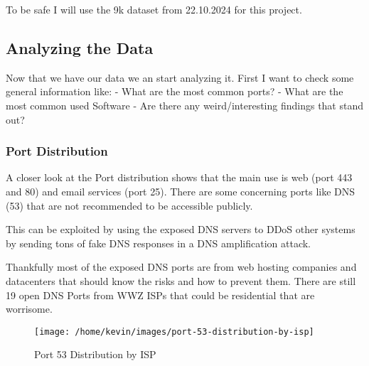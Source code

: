\documentclass[11pt,a4paper]{article}
\begin{document}
\begin{data}
To be safe I will use the 9k dataset from 22.10.2024 for this project.

\subsection{Analyzing the Data}
Now that we have our data we an start analyzing it. First I want to check some general information like:
- What are the most common ports?
- What are the most common used Software
- Are there any weird/interesting findings that stand out?

\newpage
\subsubsection{Port Distribution}
A closer look at the Port distribution shows that the main use is web (port 443 and 80) and email services (port 25). There are
some concerning ports like DNS (53) that are not recommended to be accessible publicly.

This can be exploited by using the exposed DNS servers to DDoS other systems by sending tons of fake DNS responses in a DNS amplification attack.

Thankfully most of the exposed DNS ports are from web hosting companies and datacenters that should know the risks and how to prevent them.
There are still 19 open DNS Ports from WWZ ISPs that could be residential that are worrisome.

\begin{figure}[!h]
    \centering
    \texttt{[image: /home/kevin/images/port-53-distribution-by-isp]}
    \caption{Port 53 Distribution by ISP}
    \label{fig:port-53-distribution-by-isp}
\end{figure}


\end{data}
\newpage
\end{document}
